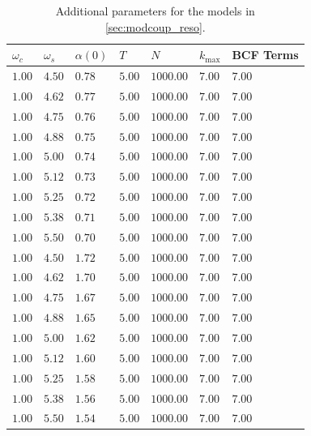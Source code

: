 \begin{table}
  \centering
  \begin{tabular}{lllllll}
  \hline
   $ω_c$   & $ω_s$   & $α(0)$   & $T$    & $N$       & $k_{\mathrm{max}}$   & BCF Terms   \\
  \hline
   $1.00$  & $4.50$  & $0.78$   & $5.00$ & $1000.00$ & $7.00$               & $7.00$      \\
   $1.00$  & $4.62$  & $0.77$   & $5.00$ & $1000.00$ & $7.00$               & $7.00$      \\
   $1.00$  & $4.75$  & $0.76$   & $5.00$ & $1000.00$ & $7.00$               & $7.00$      \\
   $1.00$  & $4.88$  & $0.75$   & $5.00$ & $1000.00$ & $7.00$               & $7.00$      \\
   $1.00$  & $5.00$  & $0.74$   & $5.00$ & $1000.00$ & $7.00$               & $7.00$      \\
   $1.00$  & $5.12$  & $0.73$   & $5.00$ & $1000.00$ & $7.00$               & $7.00$      \\
   $1.00$  & $5.25$  & $0.72$   & $5.00$ & $1000.00$ & $7.00$               & $7.00$      \\
   $1.00$  & $5.38$  & $0.71$   & $5.00$ & $1000.00$ & $7.00$               & $7.00$      \\
   $1.00$  & $5.50$  & $0.70$   & $5.00$ & $1000.00$ & $7.00$               & $7.00$      \\
   $1.00$  & $4.50$  & $1.72$   & $5.00$ & $1000.00$ & $7.00$               & $7.00$      \\
   $1.00$  & $4.62$  & $1.70$   & $5.00$ & $1000.00$ & $7.00$               & $7.00$      \\
   $1.00$  & $4.75$  & $1.67$   & $5.00$ & $1000.00$ & $7.00$               & $7.00$      \\
   $1.00$  & $4.88$  & $1.65$   & $5.00$ & $1000.00$ & $7.00$               & $7.00$      \\
   $1.00$  & $5.00$  & $1.62$   & $5.00$ & $1000.00$ & $7.00$               & $7.00$      \\
   $1.00$  & $5.12$  & $1.60$   & $5.00$ & $1000.00$ & $7.00$               & $7.00$      \\
   $1.00$  & $5.25$  & $1.58$   & $5.00$ & $1000.00$ & $7.00$               & $7.00$      \\
   $1.00$  & $5.38$  & $1.56$   & $5.00$ & $1000.00$ & $7.00$               & $7.00$      \\
   $1.00$  & $5.50$  & $1.54$   & $5.00$ & $1000.00$ & $7.00$               & $7.00$      \\
  \hline
  \end{tabular}
  \caption{\label{tab:plus_tune}Additional parameters for the models in
     \cref{sec:modcoup_reso}.}
\end{table}
